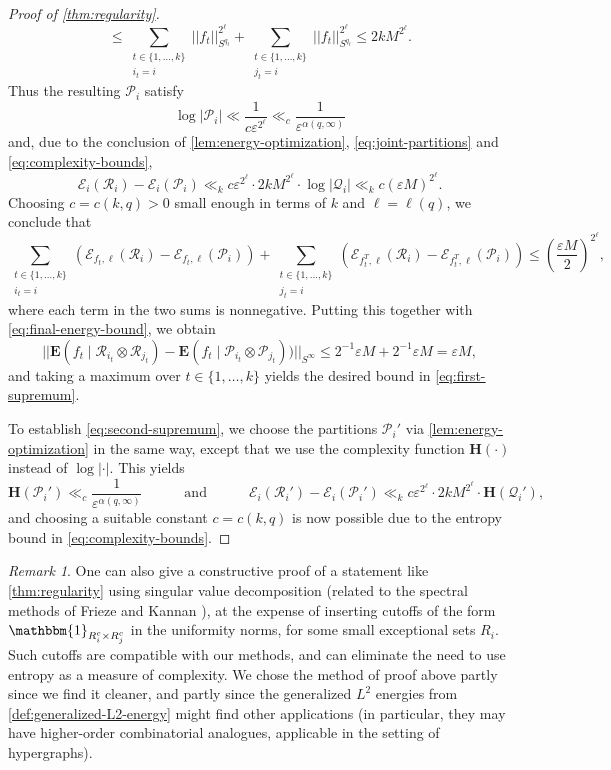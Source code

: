 \documentclass[reqno,11pt]{amsart}
\theoremstyle{definition}
\theoremstyle{remark}
\newtheorem*{remark}{Remark}
\numberwithin{equation}{section}
\renewcommand{\H}{\mathbf{H}}
\newcommand{\E}{\mathbf{E}}
\newcommand{\mE}{\mathcal{E}}
\newcommand{\mR}{\mathcal{R}}
\newcommand{\mP}{\mathcal{P}}
\newcommand{\mQ}{\mathcal{Q}}
\newcommand{\one}{\mathbbm{1}}
\newcommand{\eps}{\varepsilon}
\begin{document}
\begin{proof}[Proof of \cref{thm:regularity}]
\[    \le 
    \sum_{\substack{t \in \{1, \ldots, k\} \\ i_t = i}} ||f_t||_{S^{q_t}}^{2^\ell} + 
    \sum_{\substack{t \in \{1, \ldots, k\} \\ j_t = i}} ||f_t||_{S^{q_t}}^{2^\ell} 
    \le 2k 
    M^{2^\ell}.
\]
Thus the resulting $\mP_i$ satisfy 
\[
    \log |\mP_i| \ll \frac{1}{c\eps^{2^\ell}} \ll_c \frac{1}{\eps^{\alpha(q,\infty)}}
\]
and, due to the conclusion of \cref{lem:energy-optimization}, \cref{eq:joint-partitions} and \cref{eq:complexity-bounds},
\[
    \mE_i(\mR_i) - \mE_i(\mP_i)
    \ll_k c\eps^{2^\ell} \cdot 2k M^{2^\ell} \cdot  \log |\mQ_i|
    \ll_k 
    c (\eps M)^{2^\ell}.
\]
Choosing $c = c(k,q) > 0$ small enough in terms of $k$ and $\ell = \ell(q)$, we conclude that
\[
    \sum_{\substack{t \in \{1, \ldots, k\} \\ i_t = i}} (\mE_{f_t,\ell}(\mR_i) -
    \mE_{f_t,\ell}(\mP_i)) 
    + 
    \sum_{\substack{t \in \{1, \ldots, k\} \\ j_t = i}} (\mE_{f_t^T,\ell}(\mR_i) -
    \mE_{f_t^T,\ell}(\mP_i))
    \le \left(\frac{\eps M}{2}\right)^{2^\ell},
\]
where each term in the two sums is nonnegative.
Putting this together with \cref{eq:final-energy-bound}, we obtain
\[
    ||\E(f_t \mid \mR_{i_t} \otimes \mR_{j_t}) - \E(f_t \mid \mP_{i_t} \otimes \mP_{j_t}))||_{S^\infty} \le 
    2^{-1} \eps M + 2^{-1} \eps M
    =
    \eps M,
\]
and taking a maximum over $t \in \{1, \ldots, k\}$ yields the desired bound in \cref{eq:first-supremum}. 

To establish \cref{eq:second-supremum}, we choose the partitions $\mP_i'$ via \cref{lem:energy-optimization} in the same way, except that we use the complexity function $\H(\cdot)$ instead of $\log |\cdot|$. This yields
\[
    \H(\mP_i') \ll_c \frac{1}{\eps^{\alpha(q,\infty)}}
    \qquad \quad 
    \text{and} 
    \qquad \quad 
    \mE_i(\mR_i') - \mE_i(\mP_i')
    \ll_k c\eps^{2^\ell} \cdot 2k M^{2^\ell} \cdot  \H(\mQ_i'),
\]
and choosing a suitable constant $c = c(k, q)$ is now possible due to the entropy bound in  \cref{eq:complexity-bounds}.
\end{proof}


\begin{remark}
One can also give a constructive proof of a statement like \cref{thm:regularity} using singular value decomposition (related to the spectral methods of Frieze and Kannan \cite{frieze1999simple,frieze1999quick}),
at the expense of inserting cutoffs of the form $\one_{R_{i}^c \times R_{j}^c}$ in the uniformity norms, for some small exceptional sets $R_i$. Such cutoffs are compatible with our methods, and can eliminate the need to use entropy as a measure of complexity. We chose the method of proof above partly since we find it cleaner, and partly since the generalized $L^2$ energies from \cref{def:generalized-L2-energy} might find other applications (in particular, they may have higher-order combinatorial analogues, applicable in the setting of hypergraphs).
\end{remark}
\end{document}
